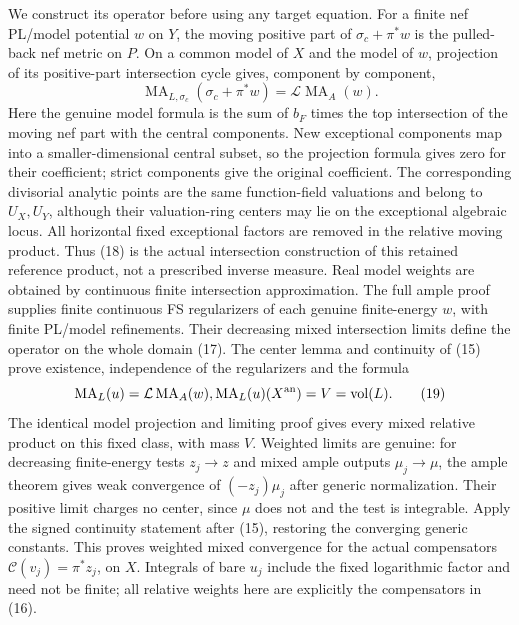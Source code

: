 \documentclass[11pt]{article}
\newcommand{\vol}{\operatorname{vol}}
\newcommand{\MA}{\operatorname{MA}}
\begin{document}
We construct its operator before using any target equation. For a
finite nef PL/model potential $w$ on $Y$, the moving positive part
of $\sigma_c+\pi^*w$ is the pulled-back nef metric on $P$.
On a common model of $X$ and the model of $w$, projection of its
positive-part intersection cycle gives, component by component,
\[
        \MA_{L,\sigma_c}(\sigma_c+\pi^*w)
                       =\mathcal L\MA_A(w).               \tag{18}
\]
Here the genuine model formula is the sum of $b_F$ times the top
intersection of the moving nef part with the central components.
New exceptional components map into a smaller-dimensional central
subset, so the projection formula gives zero for their coefficient;
strict components give the original coefficient. The corresponding
divisorial analytic points are the same function-field valuations
and belong to $U_X,U_Y$, although their valuation-ring centers may
lie on the exceptional algebraic locus. All horizontal fixed
exceptional factors are removed in the relative moving product.
Thus (18) is the actual intersection construction of this retained
reference product, not a prescribed inverse measure. Real model
weights are obtained by continuous finite intersection approximation.
The full ample proof supplies finite continuous FS regularizers
of each genuine finite-energy $w$, with finite PL/model refinements.
Their decreasing mixed intersection limits define the operator on
the whole domain (17). The center lemma and continuity of (15)
prove existence, independence of the regularizers and the formula
\[
                 \MA_L(u)=\mathcal L\MA_A(w),
                   \MA_L(u)(X^{\rm an})=V=\vol(L).         \tag{19}
\]
The identical model projection and limiting proof gives every mixed
relative product on this fixed class, with mass $V$. Weighted limits
are genuine: for decreasing finite-energy tests $z_j\to z$ and
mixed ample outputs $\mu_j\to\mu$, the ample theorem gives weak
convergence of $(-z_j)\mu_j$ after generic normalization. Their
positive limit charges no center, since $\mu$ does not and the
test is integrable. Apply the signed continuity statement after
(15), restoring the converging generic constants. This proves
weighted mixed convergence for the actual compensators
$\mathcal C(v_j)=\pi^*z_j$, on $X$. Integrals of bare $u_j$
include the fixed logarithmic factor and need not be finite; all
relative weights here are explicitly the compensators in (16).
\end{document}
